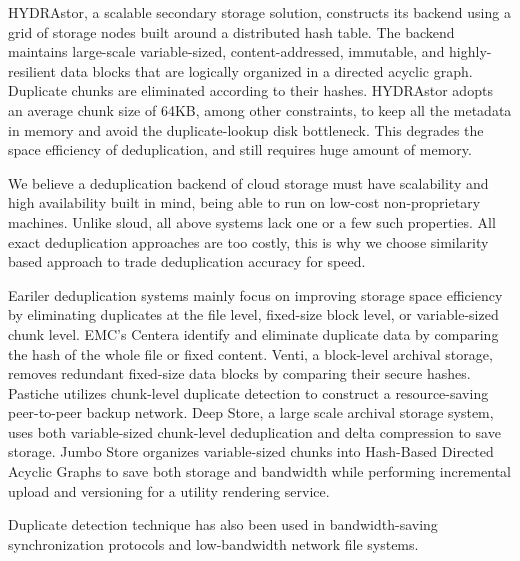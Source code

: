 HYDRAstor\cite{hydrastor09}, a scalable secondary storage solution, 
constructs its backend using a grid of storage nodes built around a distributed hash table. 
The backend maintains large-scale variable-sized, content-addressed, immutable, 
and highly-resilient data blocks that are logically organized in a directed acyclic graph. 
Duplicate chunks are eliminated according to their hashes. 
HYDRAstor adopts an average chunk size of 64KB, among other constraints, 
to keep all the metadata in memory and avoid the duplicate-lookup disk bottleneck. 
This degrades the space efficiency of deduplication, and still requires huge amount of memory.

We believe a deduplication backend of cloud storage must have scalability and
 high availability built in mind, being able to run on low-cost non-proprietary machines.
  Unlike sloud, all above systems lack one or a few such properties. All exact deduplication approaches
are too costly, this is why we choose similarity based approach to trade deduplication
accuracy for speed. 

Eariler deduplication systems mainly focus on improving storage space efficiency by eliminating 
duplicates at the file level, fixed-size block level, or variable-sized chunk level. 
EMC's Centera\cite{emc_centera} identify and eliminate duplicate data by comparing 
the hash of the whole file or fixed content. Venti\cite{venti02}, a block-level archival storage, 
removes redundant fixed-size data blocks by comparing their secure hashes. Pastiche\cite{pastiche02} 
utilizes chunk-level duplicate detection to construct a resource-saving peer-to-peer backup network. 
Deep Store\cite{deepstore05}, a large scale archival storage system, uses both variable-sized 
chunk-level deduplication and delta compression to save storage. Jumbo Store\cite{jumbo07} organizes 
variable-sized chunks into Hash-Based Directed Acyclic Graphs to save both storage and 
bandwidth while performing incremental upload and versioning for a utility rendering service. 

Duplicate detection technique has also been used in bandwidth-saving synchronization protocols\cite{rsync} 
and low-bandwidth network file systems\cite{lbfs01}.